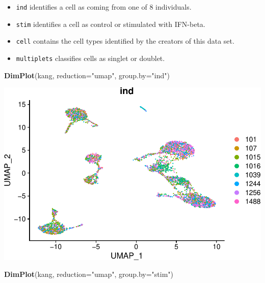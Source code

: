 \documentclass[
]{book}
\newenvironment{Shaded}{\begin{snugshade}}{\end{snugshade}}
\newcommand{\AttributeTok}[1]{\textcolor[rgb]{0.13,0.29,0.53}{#1}}
\newcommand{\FunctionTok}[1]{\textcolor[rgb]{0.13,0.29,0.53}{\textbf{#1}}}
\newcommand{\NormalTok}[1]{#1}
\newcommand{\StringTok}[1]{\textcolor[rgb]{0.31,0.60,0.02}{#1}}
\providecommand{\tightlist}{%
  \setlength{\itemsep}{0pt}\setlength{\parskip}{0pt}}
\begin{document}
\begin{itemize}
\tightlist
\item
  \texttt{ind} identifies a cell as coming from one of 8 individuals.
\item
  \texttt{stim} identifies a cell as control or stimulated with IFN-beta.
\item
  \texttt{cell} contains the cell types identified by the creators of this data set.
\item
  \texttt{multiplets} classifies cells as singlet or doublet.
\end{itemize}

\begin{Shaded}
\begin{Highlighting}[]
\FunctionTok{DimPlot}\NormalTok{(kang, }\AttributeTok{reduction=}\StringTok{"umap"}\NormalTok{, }\AttributeTok{group.by=}\StringTok{"ind"}\NormalTok{)}
\end{Highlighting}
\end{Shaded}

\includegraphics{scRNAseqInR_Doco_files/figure-latex/unnamed-chunk-67-1.pdf}

\begin{Shaded}
\begin{Highlighting}[]
\FunctionTok{DimPlot}\NormalTok{(kang, }\AttributeTok{reduction=}\StringTok{"umap"}\NormalTok{, }\AttributeTok{group.by=}\StringTok{"stim"}\NormalTok{)}
\end{Highlighting}
\end{Shaded}
\end{document}
